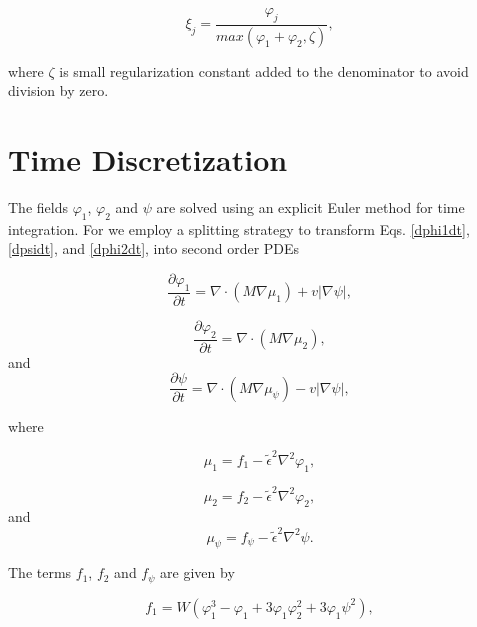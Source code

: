 \documentclass[11pt]{article}
\begin{document}
\begin{equation} \label{xi_j}
\xi_{j} = \frac{\varphi_{j}}{max\left(\varphi_1 + \varphi_2,\zeta\right)},
\end{equation}

where $\zeta$ is small regularization constant  added to the denominator to avoid division by zero.

\bigskip
\section{Time Discretization}

The fields $\varphi_1$, $\varphi_2$ and $\psi$ are solved using an explicit Euler method for time integration. For we employ a splitting strategy to transform Eqs. \eqref{dphi1dt}, \eqref{dpsidt}, and \eqref{dphi2dt}, into second order PDEs

\begin{equation} \label{dphi1dt_split}
\frac{\partial \varphi_1}{\partial t} = \nabla \cdot \left(M\nabla\mu_1 \right)+v\big|\nabla \psi \big|,
\end{equation}

\begin{equation} \label{dphi2dt_split}
\frac{\partial\varphi_2}{\partial t}=\nabla \cdot \left(M\nabla\mu_2 \right),
\end{equation}
and
\begin{equation} \label{dpsidt_split}
\frac{\partial \psi}{\partial t} = \nabla \cdot \left(M\nabla\mu_{\psi} \right)-v\big|\nabla \psi \big|,
\end{equation}

where 

\begin{equation} \label{mu_phi1}
\mu_{1}=f_1-\widetilde{\epsilon}^2\nabla^2\varphi_{1},
\end{equation}

\begin{equation} \label{mu_phi2}
\mu_{2}=f_2-\widetilde{\epsilon}^2\nabla^2\varphi_{2},
\end{equation}
and
\begin{equation} \label{mu_psi}
\mu_{\psi}=f_{\psi}-\widetilde{\epsilon}^2\nabla^2\psi.
\end{equation}

The terms $f_1$, $f_2$ and $f_\psi$ are given by

\begin{equation} \label{f_1}
f_1=W\left(\varphi_{1}^3-\varphi_{1}+3\varphi_{1}\varphi_{2}^2+3\varphi_{1}\psi^2\right),
\end{equation}
\end{document}
